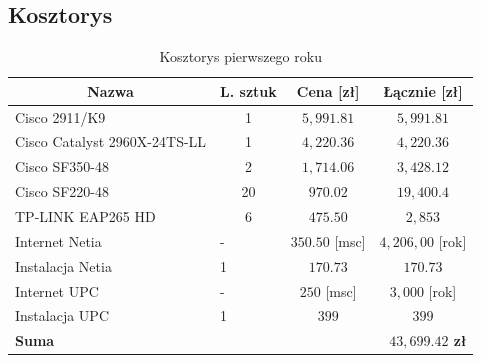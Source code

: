 \documentclass[a4paper,12pt]{extarticle}  %
\begin{document}
\subsection{Kosztorys}
\begin{table}[H]
	\centering
	\caption{Kosztorys pierwszego roku}
	\begin{tabular}{|llc|c|}
		\hline
		\multicolumn{1}{|c|}{\textbf{Nazwa}}               & \multicolumn{1}{c|}{\textbf{L. sztuk}} & \textbf{Cena [zł]}    & \textbf{Łącznie [zł]}                        \\ \hline
		\multicolumn{1}{|l|}{Cisco 2911/K9}                & \multicolumn{1}{c|}{1}                 & $5,991.81$            & $5,991.81$                                   \\ \hline
		\multicolumn{1}{|l|}{Cisco Catalyst 2960X-24TS-LL} & \multicolumn{1}{c|}{1}                 & $4,220.36$            & $4,220.36$                                   \\ \hline
		\multicolumn{1}{|l|}{Cisco SF350-48}               & \multicolumn{1}{c|}{2}                 & $1,714.06$            & $3,428.12$                                   \\ \hline
		\multicolumn{1}{|l|}{Cisco SF220-48}               & \multicolumn{1}{c|}{20}                & $970.02$              & $19,400.4$                                   \\ \hline
		\multicolumn{1}{|l|}{TP-LINK EAP265 HD}            & \multicolumn{1}{c|}{6}                 & $475.50$              & $2,853$                                      \\ \hline
		\multicolumn{1}{|l|}{Internet Netia}               & \multicolumn{1}{l|}{-}                 & $350.50$ [msc]        & $4,206,00$ [rok]                             \\ \hline
		\multicolumn{1}{|l|}{Instalacja Netia}             & \multicolumn{1}{l|}{1}                 & $170.73$              & $170.73$                                     \\ \hline
		\multicolumn{1}{|l|}{Internet UPC}                 & \multicolumn{1}{l|}{-}                 & $250$ [msc]           & $3,000$ [rok]                                \\ \hline
		\multicolumn{1}{|l|}{Instalacja UPC}               & \multicolumn{1}{l|}{1}                 & $399$                 & $399$                                        \\ \hline
		\textbf{Suma}                                      &                                        & \multicolumn{1}{l|}{} & \multicolumn{1}{r|}{\textbf{$43,699.42$ zł}} \\ \hline
	\end{tabular}
\end{table}
\end{document}
